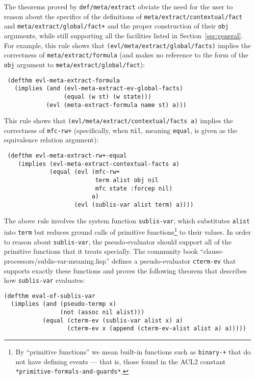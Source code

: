 The theorems proved by \texttt{def\-/meta\-/extract} obviate the need for the user to reason about
the specifics of the definitions of
\texttt{meta\-/extract\-/contextual\-/fact} and
\texttt{meta\-/extract\-/global\-/fact+} and the proper construction
of their \texttt{obj} arguments, while still supporting all the facilities listed in Section~\ref{sec:general}.
For example, this rule shows that
\texttt{(evl\-/meta\-/extract\-/global\-/facts)} implies the correctness of \texttt{meta\-/extract\-/formula} (and makes no reference to the form of the \texttt{obj} argument to \texttt{meta\-/extract\-/global\-/fact}):
\begin{verbatim}
 (defthm evl-meta-extract-formula
   (implies (and (evl-meta-extract-ev-global-facts)
                 (equal (w st) (w state)))
            (evl (meta-extract-formula name st) a)))

\end{verbatim}
This rule shows that
\texttt{(evl\-/meta\-/extract\-/contextual\-/facts a)} implies the correctness
of \texttt{mfc-rw+} (specifically, when \texttt{nil}, meaning
\texttt{equal}, is given as the equivalence relation argument):
\begin{verbatim}
 (defthm evl-meta-extract-rw+-equal
    (implies (evl-meta-extract-contextual-facts a)
             (equal (evl (mfc-rw+
                          term alist obj nil
                          mfc state :forcep nil)
                         a)
                    (evl (sublis-var alist term) a))))
\end{verbatim}
The above rule involves the system function {\tt sublis-var}, which
substitutes {\tt alist} into {\tt term} but reduces ground calls of
primitive functions\footnote{By ``primitive functions'' we mean
  built-in functions such as {\tt binary-+} that do not have defining
  events --- that is, those found in the ACL2 constant {\tt
    *primitive-formals-and-guards*}.} to their values.  In order to
reason about {\tt sublis-var}, the pseudo-evaluator should support all of
the primitive functions that it treats specially.  The community book
``clause-processors/sublis-var-meaning.lisp'' defines a
pseudo-evaluator {\tt cterm-ev} that supports exactly these functions
and proves the following theorem that describes how {\tt sublis-var}
evaluates:
\begin{verbatim}
(defthm eval-of-sublis-var
  (implies (and (pseudo-termp x)
                (not (assoc nil alist)))
           (equal (cterm-ev (sublis-var alist x) a)
                  (cterm-ev x (append (cterm-ev-alist alist a) a)))))
\end{verbatim}


